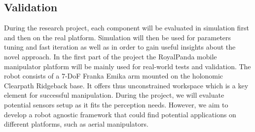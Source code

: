 \subsection{Validation} 
During the research project, each component will be evaluated in simulation first and then on the real platform. Simulation will then be used for parameters tuning and fast iteration as well as in order to gain useful insights about the novel approach. In the first part of the project the RoyalPanda mobile manipulator platform will be mainly used for real-world tests and validation. The robot consists of a 7-DoF Franka Emika arm mounted on the holonomic Clearpath Ridgeback base. It offers thus unconstrained workspace which is a key element for successful manipulation. During the project, we will evaluate potential sensors setup as it fits the perception needs. However, we aim to develop a robot agnostic framework that could find potential applications on different platforms, such as aerial manipulators. 